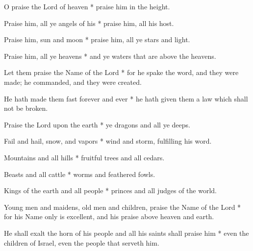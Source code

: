 O praise the Lord of heaven * praise him in the height.

Praise him, all ye angels of his * praise him, all his host.

Praise him, sun and moon * praise him, all ye stars and light.

Praise him, all ye heavens * and ye waters that are above the heavens.

Let them praise the Name of the Lord * for he spake the word, and they were made; he commanded, and they were created.

He hath made them fast forever and ever * he hath given them a law which shall not be broken.

Praise the Lord upon the earth * ye dragons and all ye deeps.

Fail and hail, snow, and vapors * wind and storm, fulfilling his word.

Mountains and all hills * fruitful trees and all cedars.

Beasts and all cattle * worms and feathered fowls.

Kings of the earth and all people * princes and all judges of the world.

Young men and maidens, old men and children, praise the Name of the Lord * for his Name only is excellent, and his praise above heaven and earth.

He shall exalt the horn of his people and all his saints shall praise him * even the children of Israel, even the people that serveth him.